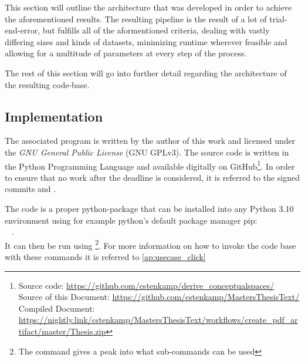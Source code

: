 
This section will outline the architecture that was developed in order to achieve the aforementioned results. The resulting pipeline is the result of a lot of trial-end-error, but fulfills all of the aformentioned criteria, dealing with vastly differing sizes and kinds of datasets, minimizing runtime wherever feasible and allowing for a multitude of parameters at every step of the process. %

The rest of this section will go into further detail regarding the architecture of the resulting code-base. 

\subsection{Implementation}

The associated program is written by the author of this work and licensed under the \emph{GNU General Public License} (GNU GPLv3). The source code is written in the Python Programming Language and available digitally on GitHub\footnote{Source code: \url{https://github.com/cstenkamp/derive_conceptualspaces/}\\Source of this Document: \url{https://github.com/cstenkamp/MastersThesisText/}\\Compiled Document: \url{https://nightly.link/cstenkamp/MastersThesisText/workflows/create_pdf_artifact/master/Thesis.zip}}. In order to ensure that no work after the deadline is considered, it is referred to the signed commits  and . 

The code is a proper python-package that can be installed into any Python 3.10 environment using for example python's default package manager pip:\\ ~ .\\ It can then be run using  \footnote{The command  gives a peak into what sub-commands can be used}. For more information on how to invoke the code base with these commands it is referred to \autoref{ap:usecase_click}


